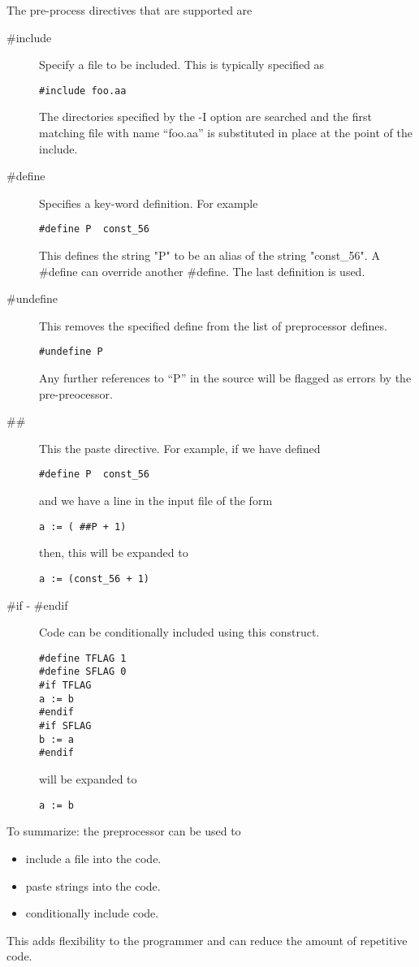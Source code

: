 The pre-process directives that are supported are
\begin{description}
\item[\#include]  Specify a file to be included.  This is typically specified
as 
\begin{verbatim}
#include foo.aa
\end{verbatim}
The directories specified by the -I option are searched and the first
matching file with name ``foo.aa'' is substituted in place at the point
of the include.
\item[\#define]  Specifies a key-word definition.  For example
\begin{verbatim}
#define P  const_56
\end{verbatim}
This defines the  string "P" to be an alias of the string "const\_56".
A \#define can override another \#define.  The last definition is used.
\item[\#undefine]  This removes the specified define from the list
of preprocessor defines.
\begin{verbatim}
#undefine P
\end{verbatim}
Any further references to ``P'' in the source will be
flagged as errors by the pre-preocessor.
\item[\#\#]  This the paste directive.   For example, if we have
defined
\begin{verbatim}
#define P  const_56
\end{verbatim}
and we have a line in the input file of the form
\begin{verbatim}
a := ( ##P + 1)
\end{verbatim}
then, this will be expanded to
\begin{verbatim}
a := (const_56 + 1)
\end{verbatim}
\item [\#if - \#endif] 
Code can be conditionally included using this construct.
\begin{verbatim}
#define TFLAG 1
#define SFLAG 0
#if TFLAG
a := b
#endif 
#if SFLAG
b := a
#endif
\end{verbatim}
will be expanded to
\begin{verbatim}
a := b
\end{verbatim}
\end{description}

To summarize: the preprocessor can be used to 
\begin{itemize}
\item include a file into the code.
\item paste strings into the code.
\item conditionally include code.
\end{itemize}
This adds flexibility to the programmer and
can reduce the amount of repetitive code.



